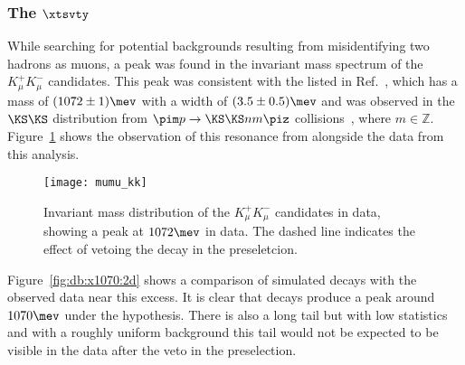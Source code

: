 \subsubsection[The \xtsvty]{The $\boldsymbol{\xtsvty}$}
\label{sec:x1070}

While searching for potential backgrounds resulting from misidentifying two hadrons as muons, a
peak was found in the invariant mass spectrum of the $K_\mu^+K_\mu^-$ candidates.
This peak was consistent with the \xtsvty listed in Ref.~\cite{PDG2014}, which has a mass of
$(1072\pm1)\mev$ with a width of $(3.5\pm0.5)\mev$ and was observed in the $\KS\KS$ distribution
from $\pim p \to \KS \KS n m\piz$ collisions~\cite{x1070vlad}, where $m\in\mathbb{Z}$.
Figure~\ref{fig:x1070} shows the observation of this resonance from  alongside
the data from this analysis.

\begin{figure}
  \begin{center}
    \texttt{[image: mumu\_kk]}
    \caption{
      Invariant mass distribution of the $K_\mu^+K_\mu^-$ candidates in data, showing a peak at
      \approx$1072\mev$ in data.
      The dashed line indicates the effect of vetoing the decay
      \decay{\KS}{\pip\pim} in the preseletcion.
    }
    \label{fig:x1070}
  \end{center}
\end{figure}

Figure~\ref{fig:db:x1070:2d} shows a comparison of simulated \decay{\KS}{\pipi} decays with the
observed data near this excess.
It is clear that \decay{\KS}{\pipi} decays produce a peak around $1070\mev$ under the \kk
hypothesis.
There is also a long tail but with low statistics and with a roughly uniform
background this tail would not be expected to be visible in the data after the \KS veto in the
preselection.

